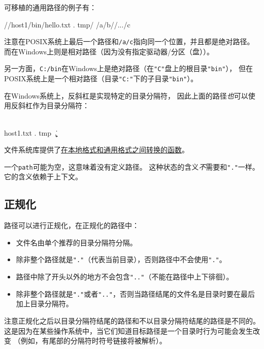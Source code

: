 可移植的通用路径的例子有：
\begin{blacklisting}
    //host1/bin/hello.txt
    .
    tmp/
    /a/b//.../c
\end{blacklisting}
注意在POSIX系统上最后一个路径和\texttt{/a/c}指向同一个位置，并且都是绝对路径。
而在Windows上则是相对路径（因为没有指定驱动器/分区（盘））。

另一方面，\texttt{C:/bin}在Windows上是绝对路径（在\texttt{"C"}盘上的根目录\texttt{"bin"}），
但在POSIX系统上是一个相对路径（目录\texttt{"C:"}下的子目录\texttt{"bin"}）。

在Windows系统上，反斜杠是实现特定的目录分隔符，
因此上面的路径\emph{也}可以使用反斜杠作为目录分隔符：
\begin{blacklisting}
    \\host1\bin\hello.txt
    .
    tmp\
    \a\b\..\c
\end{blacklisting}
文件系统库提供了\hyperref[ch20.3.4]{在本地格式和通用格式之间转换的函数}。

一个\texttt{path}可能为空，这意味着没有定义路径。
这种状态的含义\emph{不}需要和\texttt{"."}一样。它的含义依赖于上下文。

\subsection{正规化}
路径可以进行正规化，在正规化的路径中：
\begin{itemize}
    \item 文件名由单个推荐的目录分隔符分隔。
    \item 除非整个路径就是\texttt{"."}（代表当前目录），否则路径中不会使用\texttt{"."}。
    \item 路径中除了开头以外的地方不会包含\texttt{".."}（不能在路径中上下徘徊）。
    \item 除非整个路径就是\texttt{"."}或者\texttt{".."}，否则当路径结尾的文件名是目录时要在最后加上目录分隔符。
\end{itemize}
注意正规化之后以目录分隔符结尾的路径和不以目录分隔符结尾的路径是不同的。
这是因为在某些操作系统中，当它们知道目标路径是一个目录时行为可能会发生改变
（例如，有尾部的分隔符时符号链接将被解析）。

